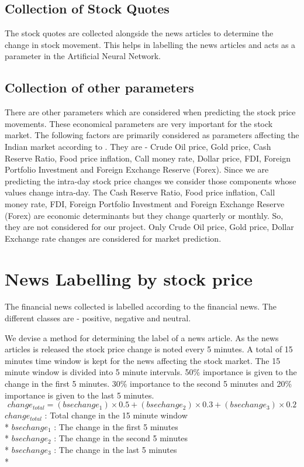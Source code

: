 \documentclass[a4paper,12bp]{report}
\begin{document}
\subsection{Collection of Stock Quotes}
The stock quotes are collected alongside the news articles to determine the change in stock movement. This helps in labelling the news articles and acts as a parameter in the Artificial Neural Network.

\subsection{Collection of other parameters}
\label{sec:ann_parameters}
There are other parameters which are considered when predicting the stock price movements. These economical parameters are very important for the stock market. The following factors are primarily considered as parameters affecting the Indian market according to \cite{ghosh:2010}. They are - Crude Oil price, Gold price, Cash Reserve Ratio, Food price inflation, Call money rate, Dollar price, FDI, Foreign Portfolio Investment and Foreign Exchange Reserve (Forex). Since we are predicting the intra-day stock price changes we consider those components whose values change intra-day. The Cash Reserve Ratio, Food price inflation, Call money rate, FDI, Foreign Portfolio Investment and Foreign Exchange Reserve (Forex) are economic determinants but they change quarterly or monthly. So, they are not considered for our project. Only Crude Oil price, Gold price, Dollar Exchange rate changes are considered for market prediction. 

\section{News Labelling by stock price}
The financial news collected is labelled according to the financial news. The different classes are - positive, negative and neutral. 

We devise a method for determining the label of a news article. As the news articles is released the stock price change is noted every 5 minutes. A total of 15 minutes time window is kept for the news affecting the stock market. The 15 minute window is divided into 5 minute intervals. 50\% importance is given to the change in the first 5 minutes. 30\% importance to the second 5 minutes and 20\% importance is given to the last 5 minutes.
\begin{equation}
change_{total} = ( bsechange_{1} ) \times 0.5 + ( bsechange_{2} ) \times 0.3 + ( bsechange_{3} ) \times 0.2
\end{equation}
$change_{total}$ : Total change in the 15 minute window \\*
$bsechange_{1}$ : The change in the first 5 minutes \\*
$bsechange_{2}$ : The change in the second 5 minutes \\*
$bsechange_{3}$ : The change in the last 5 minutes \\*
\end{document}
